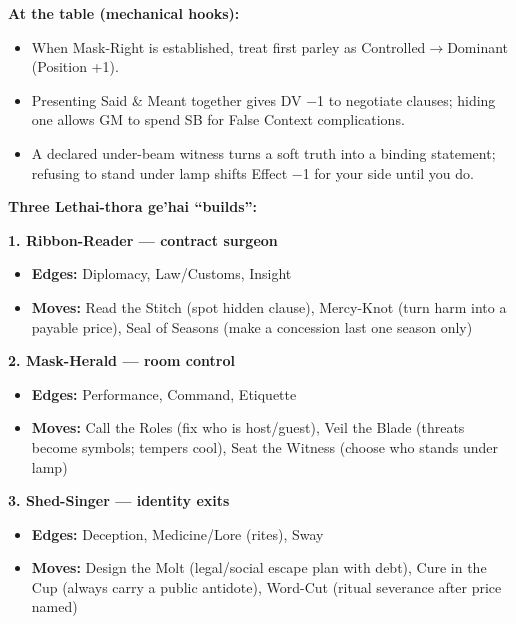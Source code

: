 \documentclass[11pt]{article}
\begin{document}
  \textbf{At the table (mechanical hooks):}
  \begin{itemize}
  \item When Mask-Right is established, treat first parley as Controlled$\rightarrow$Dominant (Position +1).
  \item Presenting Said \& Meant together gives DV −1 to negotiate clauses; hiding one allows GM to spend SB for False Context complications.
  \item A declared under-beam witness turns a soft truth into a binding statement; refusing to stand under lamp shifts Effect −1 for your side until you do.
  \end{itemize}
  
  \textbf{Three Lethai-thora ge'hai ``builds'':}
  
  \textbf{1. Ribbon-Reader --- contract surgeon}
  \begin{itemize}
  \item \textbf{Edges:} Diplomacy, Law/Customs, Insight
  \item \textbf{Moves:} Read the Stitch (spot hidden clause), Mercy-Knot (turn harm into a payable price), Seal of Seasons (make a concession last one season only)
  \end{itemize}
  
  \textbf{2. Mask-Herald --- room control}
  \begin{itemize}
  \item \textbf{Edges:} Performance, Command, Etiquette
  \item \textbf{Moves:} Call the Roles (fix who is host/guest), Veil the Blade (threats become symbols; tempers cool), Seat the Witness (choose who stands under lamp)
  \end{itemize}
  
  \textbf{3. Shed-Singer --- identity exits}
  \begin{itemize}
  \item \textbf{Edges:} Deception, Medicine/Lore (rites), Sway
  \item \textbf{Moves:} Design the Molt (legal/social escape plan with debt), Cure in the Cup (always carry a public antidote), Word-Cut (ritual severance after price named)
  \end{itemize}
  
  \newpage
  
\end{document}
